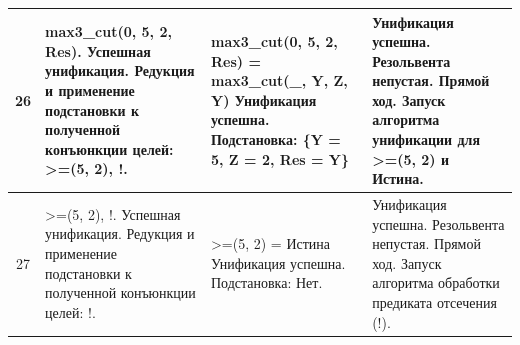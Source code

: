 \begin{tabularx}{\textwidth}{|c|>{\small}X|>{\small}X|>{\small}X|}
	26                                                                                             &
	max3\_cut(0, 5, 2, Res). \newline
	Успешная унификация. \newline
	Редукция и применение подстановки к полученной конъюнкции целей: \newline
	>=(5, 2), \newline
	!.                                                                                             &
	max3\_cut(0, 5, 2, Res) = \newline
	max3\_cut(\_, Y, Z, Y) \newline
	Унификация успешна. \newline
	Подстановка: \newline
	\{Y = 5, Z = 2, Res = Y\}                                                                      &
	Унификация успешна. \newline
	Резольвента непустая. \newline
	Прямой ход. \newline
	Запуск алгоритма унификации для >=(5, 2) и Истина.                                               \\
	\hline

	27                                                                                             &
	>=(5, 2), \newline
	!. \newline
	Успешная унификация. \newline
	Редукция и применение подстановки к полученной конъюнкции целей: \newline
	!.                                                                                             &
	>=(5, 2) = \newline
	Истина \newline
	Унификация успешна. \newline
	Подстановка: \newline
	Нет.                                                                                           &
	Унификация успешна. \newline
	Резольвента непустая. \newline
	Прямой ход. \newline
	Запуск алгоритма обработки предиката отсечения (!).                                              \\
	\hline


\end{tabularx}
